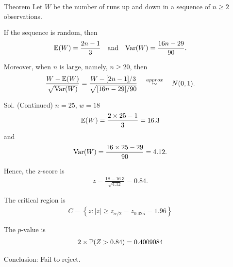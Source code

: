 \begin{frame}[fragile]
\begin{itemize}
	\item[Theorem] Let $W$ be the number of runs up and down in a sequence of $n\ge 2$ observations.
	\item[] If the sequence is random, then
	\begin{align*}
		\mathbb{E}(W)=\frac{2n-1}{3} \quad\text{and}\quad \text{Var}(W)= \frac{16n-29}{90}.
	\end{align*}
	\item[] Moreover, when $n$ is large, namely,  $n\ge 20$, then
	\bigskip
	 \begin{align*}
		\frac{W-\mathbb{E}(W)}{\sqrt{\text{Var}(W)}} = \frac{W-[2n-1]/3}{\sqrt{[16n-29]/90}}\quad\stackrel{approx}{\sim}\quad N(0,1).
	\end{align*}
	\end{itemize}
\end{frame}
\begin{frame}[fragile]
\begin{itemize}
	\item[Sol.] (Continued) $n=25$,  $w=18$
	\begin{align*}
		\mathbb{E}(W) = \frac{2\times 25 -1}{3} = 16.3
	\end{align*}
	and
	\begin{align*}
		\text{Var}(W) = \frac{16 \times 25 -29}{90} =4.12.
	\end{align*}
	\item[] Hence, the z-score is
	\begin{align*}
		z=\frac{18-16.3}{\sqrt{4.12}} = 0.84.
	\end{align*}
	\item[] The critical region is
	\begin{align*}
		C = \left\{z: |z|\ge z_{\alpha/2} =z_{0.025}= 1.96\right\}
	\end{align*}
	\item[] The $p$-value is
		 \begin{align*}
			 2 \times\mathbb{P}(Z > 0.84) = 0.4009084
		\end{align*}
	\item[] Conclusion: Fail to reject. \myQED
\end{itemize}
\end{frame}
